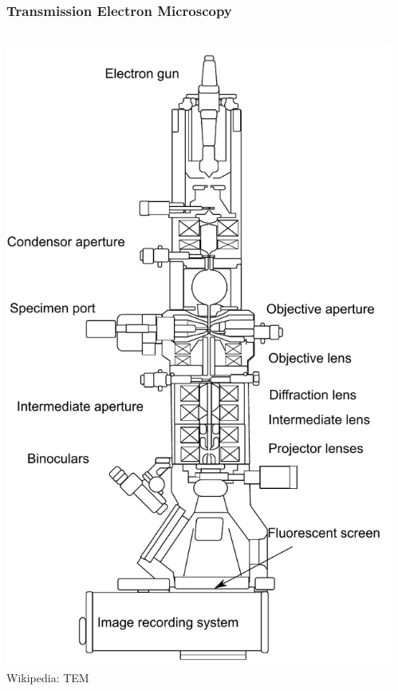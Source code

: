 \documentclass[]{beamer}%
\begin{document}
\begin{frame}
    \frametitle{Transmission Electron Microscopy}
    \begin{columns}
        \begin{column}{0.5\textwidth}
               \centering
               \includegraphics[width=\textwidth,height=0.85\textheight,keepaspectratio]{graphics/TEM} \\
               \TINY Wikipedia: TEM
        \end{column}
        \begin{column}{0.5\textwidth}

\end{column}
\end{columns}
\end{frame}
\end{document}
